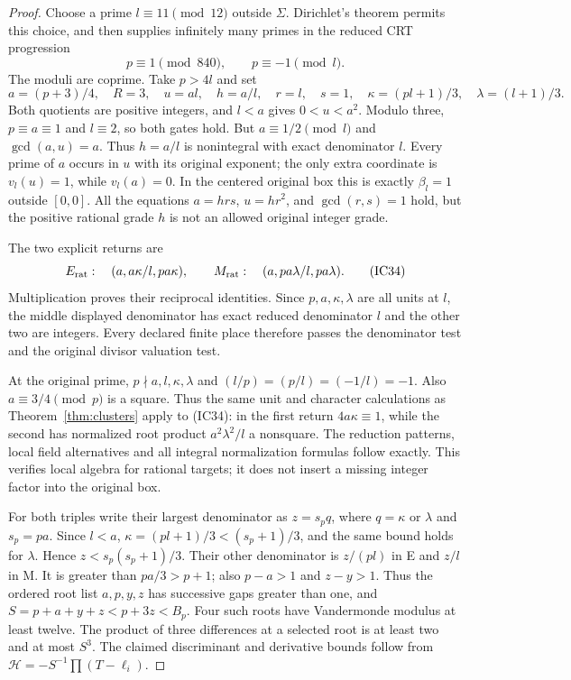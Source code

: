 \begin{proof}
Choose a prime $l\equiv11\pmod{12}$ outside $\Sigma$. Dirichlet's theorem
\cite[Theorem 18.1]{Dirichlet} permits this choice, and then supplies infinitely
many primes in the reduced CRT progression
\[
 p\equiv1\pmod{840},\qquad p\equiv-1\pmod l.
\]
The moduli are coprime. Take $p>4l$ and set
\[
 a=(p+3)/4,\quad R=3,\quad u=al,\quad
 h=a/l,\quad r=l,\quad s=1,\quad
 \kappa=(pl+1)/3,\quad\lambda=(l+1)/3.                  \tag{IC33}
\]
Both quotients are positive integers, and $l<a$ gives $0<u<a^2$.
Modulo three, $p\equiv a\equiv1$ and $l\equiv2$, so both gates hold.
But $a\equiv1/2\pmod l$ and $\gcd(a,u)=a$. Thus $h=a/l$ is nonintegral with
exact denominator $l$. Every prime of $a$ occurs in $u$ with its original
exponent; the only extra coordinate is $v_l(u)=1$, while $v_l(a)=0$.
In the centered original box this is exactly $\beta_l=1$ outside $[0,0]$.
All the equations $a=hrs$, $u=hr^2$, and $\gcd(r,s)=1$ hold, but the positive
rational grade $h$ is not an allowed original integer grade.

The two explicit returns are
\[
 E_{\rm rat}:\quad(a,a\kappa/l,pa\kappa),\qquad
 M_{\rm rat}:\quad(a,pa\lambda/l,pa\lambda).              \tag{IC34}
\]
Multiplication proves their reciprocal identities. Since $p,a,\kappa,\lambda$
are all units at $l$, the middle displayed denominator has exact reduced
denominator $l$ and the other two are integers. Every declared finite place
therefore passes the denominator test and the original divisor valuation test.

At the original prime, $p\nmid a,l,\kappa,\lambda$ and
$(l/p)=(p/l)=(-1/l)=-1$. Also $a\equiv3/4\pmod p$ is a square. Thus the same
unit and character calculations as Theorem~\ref{thm:clusters} apply to (IC34):
in the first return $4a\kappa\equiv1$, while the second has normalized root
product $a^2\lambda^2/l$ a nonsquare. The reduction patterns, local field
alternatives and all integral normalization formulas follow exactly. This
verifies local algebra for rational targets; it does not insert a missing
integer factor into the original box.

For both triples write their largest denominator as $z=s_p q$,
where $q=\kappa$ or $\lambda$ and $s_p=pa$. Since $l<a$,
$\kappa=(pl+1)/3<(s_p+1)/3$, and the same bound holds for $\lambda$.
Hence $z<s_p(s_p+1)/3$. Their other denominator is $z/(pl)$ in E and $z/l$ in M.
It is greater than $pa/3>p+1$; also $p-a>1$ and $z-y>1$. Thus the ordered root
list $a,p,y,z$ has successive gaps greater than one, and
$S=p+a+y+z<p+3z<B_p$. Four such roots have Vandermonde modulus at least twelve.
The product of three differences at a selected root is at least two and at most
$S^3$. The claimed discriminant and derivative bounds follow from
$\mathcal H=-S^{-1}\prod(T-\ell_i)$.


\end{proof}
